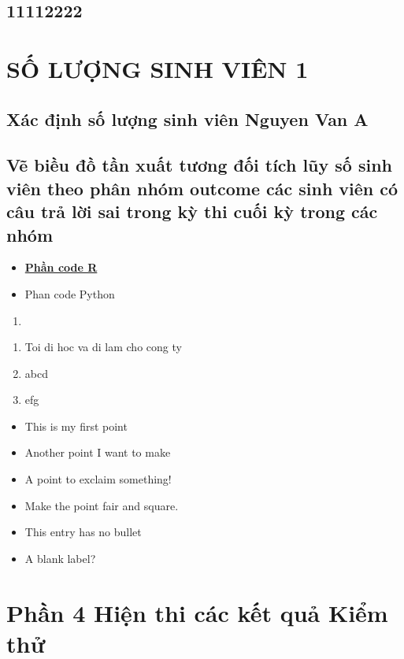 \documentclass[a4paper]{article}
\begin{document}
    \subsection{11112222}


\newpage
\section{SỐ LƯỢNG SINH VIÊN 1}
\subsection{Xác định số lượng sinh viên Nguyen Van A}
\newpage
\subsection{Vẽ biều đồ tần xuất tương đối tích lũy số sinh viên theo phân nhóm outcome các sinh viên có câu trả lời sai trong kỳ thi cuối kỳ trong các nhóm}
\begin{itemize}
    \item \large\bfseries\underline {Phần code R}
    \item Phan code Python
\end{itemize}
\begin{enumerate}
    \item 
\end{enumerate}

\begin{enumerate}
    \item Toi di hoc va {\color{red}di lam cho cong } ty
    \item  abcd
    \item efg
\end{enumerate}

\begin{itemize}
  \item This is my first point
  \item Another point I want to make 
  \item[!] A point to exclaim something!
  \item[$\blacksquare$] Make the point fair and square.
  \item[NOTE] This entry has no bullet
  \item[] A blank label?
\end{itemize}
\newpage

 \section{Phần 4 Hiện thi các kết quả Kiểm thử}
\end{document}
